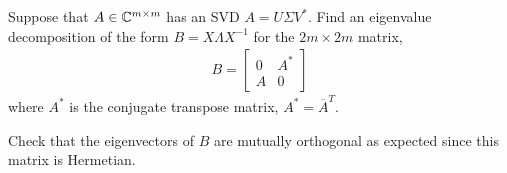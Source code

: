 \documentclass[10pt]{article}
\begin{document}
\begin{problem}
Suppose that \( A\in \mathbb{C}^{m\times m} \) has an SVD \( A = U\Sigma V^* \). Find an eigenvalue decomposition of the form \( B=X\Lambda X^{-1} \) for the \( 2m\times 2m \) matrix,
\begin{align*}
    B = \left[\begin{array}{cc}0 & A^* \\ A & 0 \end{array}\right]
\end{align*}
where \( A^* \) is the conjugate transpose matrix, \( A^* = \overline{A}^T \).

Check that the eigenvectors of \( B \) are mutually orthogonal as expected since this matrix is Hermetian.
\end{problem}
\end{document}
